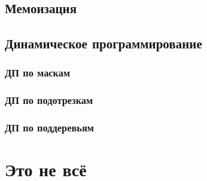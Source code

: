 \documentclass[a4paper,8pt]{article}
\begin{document}
    \subsection{Мемоизация}
    \subsection{Динамическое программирование}
        \subsubsection{ДП по маскам}
        \subsubsection{ДП по подотрезкам}
        \subsubsection{ДП по поддеревьям}
\section{Это не всё}
\end{document}
